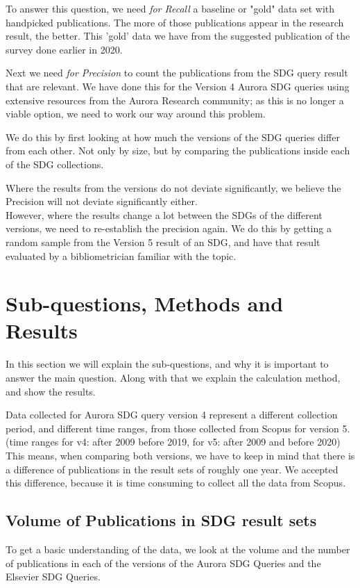 \documentclass{article}
\begin{document}
To answer this question, we need \emph{for Recall} a baseline or "gold" data set with handpicked publications. The more of those publications appear in the research result, the better. This 'gold' data we have from the suggested publication of the survey done earlier in 2020.\cite{vanderfeesten_survey_2020}

Next we need \emph{for Precision} to count the publications from the SDG query result that are relevant. We have done this for the Version 4 Aurora SDG queries using extensive resources from the Aurora Research community; as this is no longer a viable option, we need to work our way around this problem.

We do this by first looking at how much the versions of the SDG queries differ from each other. Not only by size, but by comparing the publications inside each of the SDG collections.

Where the results from the versions do not deviate significantly, we believe the Precision will not deviate significantly either. \\
However, where the results change a lot between the SDGs of the different versions, we need to re-establish the precision again. We do this by getting a random sample from the Version 5 result of an SDG, and have that result evaluated by a bibliometrician familiar with the topic.

\section{Sub-questions, Methods and Results}
In this section we will explain the sub-questions, and why it is important to answer the main question. Along with that we explain the calculation method, and show the results.

Data collected for Aurora SDG query version 4 represent a different collection period, and different time ranges, from those collected from Scopus for version 5. (time ranges for v4: after 2009 before 2019, for v5: after 2009 and before 2020) This means, when comparing both versions, we have to keep in mind that there is a difference of publications in the result sets of roughly one year. We accepted this difference, because it is time consuming to collect all the data from Scopus. 

\subsection{Volume of Publications in SDG result sets}
To get a basic understanding of the data, we look at the volume and the number of publications in each of the versions of the Aurora SDG Queries and the Elsevier SDG Queries.
\end{document}

